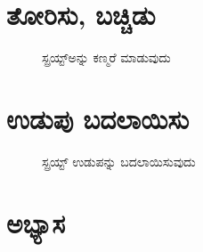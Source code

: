 \section{ತೋರಿಸು, ಬಚ್ಚಿಡು}
\begin{figure}[h]
\begin{center}
\begin{multicols}{2}
\begin{Scratch}[1]
\end{Scratch}
\begin{Scratch}[1]
\end{Scratch}

\end{multicols}
\end{center}
\caption{ಸ್ಪ್ರಯ್ಟ್ಅನ್ನು ಕಣ್ಮರೆ ಮಾಡುವುದು}
\label{vis_hide}
\end{figure}


\section{ಉಡುಪು ಬದಲಾಯಿಸು}

\begin{figure}[h]
\begin{center}
\begin{Scratch}[1]
\end{Scratch}
\end{center}
\caption{ಸ್ಪ್ರಯ್ಟ್ ಉಡುಪನ್ನು ಬದಲಾಯಿಸುವುದು}
\label{vis_looks}
\end{figure}

\section{ಅಭ್ಯಾಸ }

